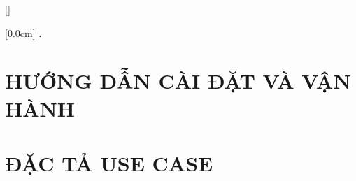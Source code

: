 \documentclass[a4paper,twoside]{report}
\theoremstyle{definition}
\begin{document}
\appendixpage
\appendices
\addappheadtotoc


{}[]
\titlespacing*{\chapter}{0pt}{-20pt}{20pt}

    [0.0cm]             %
    {\bfseries\vspace{0.3cm}}                  %
    {{\bfseries{\scshape} \thecontentslabel.\ }} %
    {}         %
    {\contentspage}         %
\chapter{HƯỚNG DẪN CÀI ĐẶT VÀ VẬN HÀNH}

\newpage
\chapter{ĐẶC TẢ USE CASE}

\end{document}
